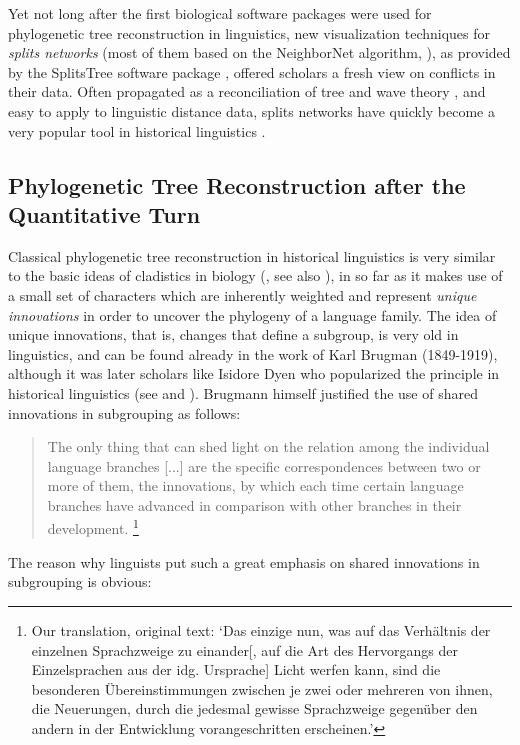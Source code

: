 \documentclass[svgnames,12pt]{scrartcl}
\begin{document}
{Yet not long after the first biological software packages were used for phylogenetic tree
reconstruction in linguistics, new
visualization techniques for \emph{splits networks} (most of them based on the NeighborNet algorithm,
\citealt{Bryant2004}), as provided by the SplitsTree software package \citep{Huson1998}, offered
scholars a fresh view on conflicts in their data. Often propagated as a reconciliation of
tree and wave theory \citep{Hamed2006,McMahon2005}, and easy to apply to
linguistic distance data, splits networks have quickly become a very popular tool in historical
linguistics \citep{Heggarty2010,Hamed2005,Bowern2010}.


\subsection{Phylogenetic Tree Reconstruction after the Quantitative Turn}
Classical phylogenetic tree reconstruction in historical linguistics is very similar to the basic
ideas of cladistics in biology (\citealt{Hennig1950}, see also \citealt[105-171]{Lass1997}), in so
far as it makes use of a small set of characters which are inherently weighted and represent \emph{unique
innovations} in order to uncover the phylogeny of a language family. The idea of unique innovations,
that is, changes that define a subgroup, is very old in linguistics, and can be found already in the
work of Karl Brugman (1849-1919), although it was later scholars like Isidore Dyen who
popularized the principle in historical linguistics (see \citealt{Chretien1963} and
\citealt{Dyen1953}). Brugmann himself justified the use of shared innovations in subgrouping as
follows:
\begin{quote}
  \small The only thing that can shed light on the relation among the individual language branches [...] are the
  specific correspondences between two or more of them, the innovations, by which each time certain
  language branches have advanced in comparison with other branches in their
  development. \cite[24]{Brugmann1967}\footnote{Our translation, original text: `Das einzige nun, was auf das Verhältnis der
  einzelnen Sprachzweige zu einander[, auf die Art des Hervorgangs der Einzelsprachen aus der idg.
  Ursprache] Licht werfen kann, sind die besonderen Übereinstimmungen zwischen je zwei oder mehreren
  von ihnen, die Neuerungen, durch die jedesmal gewisse Sprachzweige gegenüber den andern in der
  Entwicklung vorangeschritten erscheinen.'}
\end{quote}
The reason why linguists put such a great emphasis on shared innovations in subgrouping is obvious:
}
\end{document}
